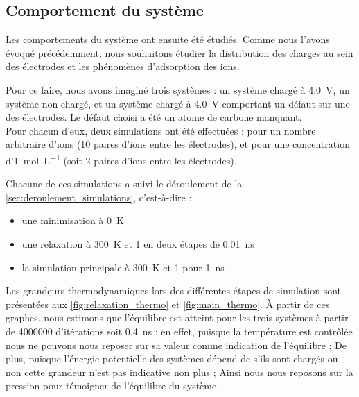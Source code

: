     \subsection{Comportement du système}

Les comportements du système ont ensuite été étudiés. Comme nous l'avons évoqué précédemment, nous souhaitons étudier la distribution des charges au sein des électrodes et les phénomènes d'adsorption des ions.

Pour ce faire, nous avons imaginé trois systèmes : un système chargé à \qty{4.0}{\volt}, un système non chargé, et un système chargé à \qty{4.0}{\volt} comportant un défaut sur une des électrodes. Le défaut choisi a été un atome de carbone manquant.\\
Pour chacun d'eux, deux simulations ont été effectuées : pour un nombre arbitraire d'ions (\num{10} paires d'ions entre les électrodes), et pour une concentration d'\qty{1}{\mole \per \liter} (soit \num{2} paires d'ions entre les électrodes).

Chacune de ces simulations a suivi le déroulement de la \autoref{sec:deroulement_simulations}, c'est-à-dire :
\begin{itemize}
    \item une minimisation à \qty{0}{\kelvin}
    \item une relaxation à \qty{300}{\kelvin} et \qty{1}{\atm} en deux étapes de \qty{0.01}{\nano \second}
    \item la simulation principale à \qty{300}{\kelvin} et \qty{1}{\atm} pour \qty{1}{\nano \second}
\end{itemize}

Les grandeurs thermodynamiques lors des différentes étapes de simulation sont présentées aux \autoref{fig:relaxation_thermo} et \ref{fig:main_thermo}. À partir de ces graphes, nous estimons que l'équilibre est atteint pour les trois systèmes à partir de \num{4000000} d'itérations soit \qty{0.4}{\nano \second} : en effet, puisque la température est contrôlée nous ne pouvons nous reposer sur sa valeur comme indication de l'équilibre ; De plus, puisque l'énergie potentielle des systèmes dépend de s'ils sont chargés ou non cette grandeur n'est pas indicative non plus ; Ainsi nous nous reposons sur la pression pour témoigner de l'équilibre du système.

